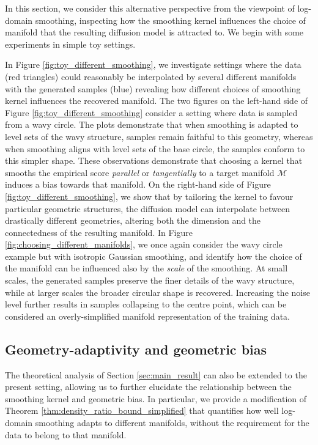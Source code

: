 \documentclass[10pt]{article}
\theoremstyle{plain}
\theoremstyle{definition}
\theoremstyle{remark}
\begin{document}
In this section, we consider this alternative perspective from the viewpoint of log-domain smoothing, inspecting how the smoothing kernel influences the choice of manifold that the resulting diffusion model is attracted to. We begin with some experiments in simple toy settings.

In Figure \ref{fig:toy_different_smoothing}, we investigate settings where the data (red triangles) could reasonably be interpolated by several different manifolds with the generated samples (blue) revealing how different choices of smoothing kernel influences the recovered manifold. The two figures on the left-hand side of Figure \ref{fig:toy_different_smoothing} consider a setting where data is sampled from a wavy circle. The plots demonstrate that when smoothing is adapted to level sets of the wavy structure, samples remain faithful to this geometry, whereas when smoothing aligns with level sets of the base circle, the samples conform to this simpler shape. These observations demonstrate that choosing a kernel that smooths the empirical score \emph{parallel} or \emph{tangentially} to a target manifold $\mathcal{M}$ induces a bias towards that manifold. On the right-hand side of Figure \ref{fig:toy_different_smoothing}, we show that by tailoring the kernel to favour particular geometric structures, the diffusion model can interpolate between drastically different geometries, altering both the dimension and the connectedness of the resulting manifold. In Figure \ref{fig:choosing_different_manifolds}, we once again consider the wavy circle example but with isotropic Gaussian smoothing, and identify how the choice of the manifold can be influenced also by the \emph{scale} of the smoothing. At small scales, the generated samples preserve the finer details of the wavy structure, while at larger scales the broader circular shape is recovered. Increasing the noise level further results in samples collapsing to the centre point, which can be considered an overly-simplified manifold representation of the training data.




\subsection{Geometry-adaptivity and geometric bias}\label{sec:theoretical-geometric-bias}
The theoretical analysis of Section \ref{sec:main_result} can also be extended to the present setting, allowing us to further elucidate the relationship between the smoothing kernel and geometric bias. In particular, we provide a modification of Theorem \ref{thm:density_ratio_bound_simplified} that quantifies how well log-domain smoothing adapts to different manifolds, without the requirement for the data to belong to that manifold.
\end{document}
